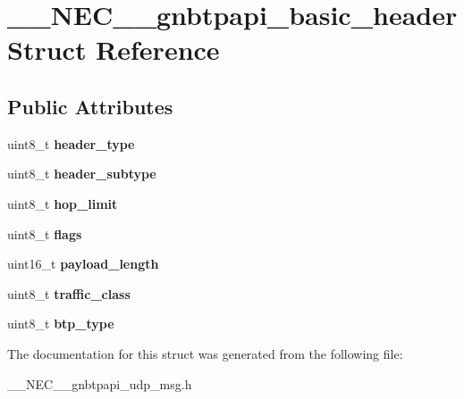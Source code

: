 \hypertarget{struct____NEC____gnbtpapi__basic__header}{\section{\-\_\-\-\_\-\-N\-E\-C\-\_\-\-\_\-gnbtpapi\-\_\-basic\-\_\-header \-Struct \-Reference}
\label{struct____NEC____gnbtpapi__basic__header}
}
\subsection*{\-Public \-Attributes}
\begin{DoxyCompactItemize}
\item 
\hypertarget{struct____NEC____gnbtpapi__basic__header_aab8d9392dd66cc4771c34963cc2b07ac}{uint8\-\_\-t {\bfseries header\-\_\-type}}\label{struct____NEC____gnbtpapi__basic__header_aab8d9392dd66cc4771c34963cc2b07ac}

\item 
\hypertarget{struct____NEC____gnbtpapi__basic__header_a825cadf99292e127c63b2483969b53fa}{uint8\-\_\-t {\bfseries header\-\_\-subtype}}\label{struct____NEC____gnbtpapi__basic__header_a825cadf99292e127c63b2483969b53fa}

\item 
\hypertarget{struct____NEC____gnbtpapi__basic__header_a497ddaefd06fa3cc23de21de5a44c991}{uint8\-\_\-t {\bfseries hop\-\_\-limit}}\label{struct____NEC____gnbtpapi__basic__header_a497ddaefd06fa3cc23de21de5a44c991}

\item 
\hypertarget{struct____NEC____gnbtpapi__basic__header_ad2d5078aa71387abf4a6377fdcf6f152}{uint8\-\_\-t {\bfseries flags}}\label{struct____NEC____gnbtpapi__basic__header_ad2d5078aa71387abf4a6377fdcf6f152}

\item 
\hypertarget{struct____NEC____gnbtpapi__basic__header_ae42b465eb22f9b1611da3eaea069a9ad}{uint16\-\_\-t {\bfseries payload\-\_\-length}}\label{struct____NEC____gnbtpapi__basic__header_ae42b465eb22f9b1611da3eaea069a9ad}

\item 
\hypertarget{struct____NEC____gnbtpapi__basic__header_a26e77c38dbb3f1ab99bb3f60c4bd7cbe}{uint8\-\_\-t {\bfseries traffic\-\_\-class}}\label{struct____NEC____gnbtpapi__basic__header_a26e77c38dbb3f1ab99bb3f60c4bd7cbe}

\item 
\hypertarget{struct____NEC____gnbtpapi__basic__header_a860dbce7f8506f3a19e4f3e0282c69f7}{uint8\-\_\-t {\bfseries btp\-\_\-type}}\label{struct____NEC____gnbtpapi__basic__header_a860dbce7f8506f3a19e4f3e0282c69f7}

\end{DoxyCompactItemize}


\-The documentation for this struct was generated from the following file\-:\begin{DoxyCompactItemize}
\item 
\-\_\-\-\_\-\-N\-E\-C\-\_\-\-\_\-gnbtpapi\-\_\-udp\-\_\-msg.\-h\end{DoxyCompactItemize}
